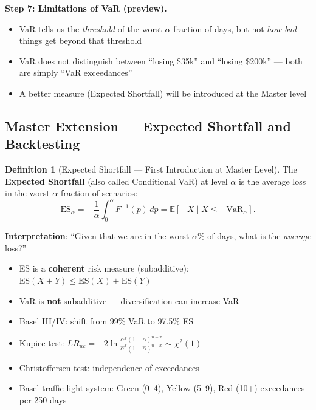 \documentclass[11pt, a4paper]{article}
\newcommand{\E}{\mathbb{E}}
\theoremstyle{definition}
\newtheorem{defn}{Definition}
\begin{document}
\vspace{0.3cm}

\noindent\textbf{Step 7: Limitations of VaR (preview).}\\
\begin{itemize}
  \item VaR tells us the \textit{threshold} of the worst $\alpha$-fraction of days, but not \textit{how bad} things get beyond that threshold
  \item VaR does not distinguish between ``losing \$35k'' and ``losing \$200k'' — both are simply ``VaR exceedances''
  \item A better measure (Expected Shortfall) will be introduced at the Master level
\end{itemize}

\subsection{Master Extension — Expected Shortfall and Backtesting}

\begin{defn}[Expected Shortfall — First Introduction at Master Level]
The \textbf{Expected Shortfall} (also called Conditional VaR) at level $\alpha$ is the average loss in the worst $\alpha$-fraction of scenarios:
\[
  \text{ES}_\alpha = -\frac{1}{\alpha}\int_0^\alpha F^{-1}(p)\,dp = \E[-X \mid X \leq -\text{VaR}_\alpha].
\]
\end{defn}

\noindent\textbf{Interpretation}: ``Given that we are in the worst $\alpha\%$ of days, what is the \textit{average} loss?''

\begin{itemize}
  \item ES is a \textbf{coherent} risk measure (subadditive): $\text{ES}(X+Y) \leq \text{ES}(X) + \text{ES}(Y)$
  \item VaR is \textbf{not} subadditive — diversification can increase VaR
  \item Basel III/IV: shift from 99\% VaR to 97.5\% ES
  \item Kupiec test: $LR_{uc} = -2\ln\frac{\alpha^x(1-\alpha)^{n-x}}{\hat{\alpha}^x(1-\hat{\alpha})^{n-x}} \sim \chi^2(1)$
  \item Christoffersen test: independence of exceedances
  \item Basel traffic light system: Green (0--4), Yellow (5--9), Red (10+) exceedances per 250 days
\end{itemize}
\end{document}
